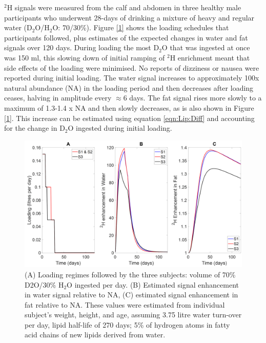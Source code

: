 \documentclass[class=article, crop=false]{standalone}
\begin{document}
$^2$H signals were measured from the calf and abdomen in three healthy male participants who underwent 28-days of drinking a mixture of heavy and regular water (D$_2$O/H$_2$O: 70/30\%). Figure \ref{1} shows the loading schedules that participants followed, plus estimates of the expected changes in water and fat signals over 120 days. During loading the most D$_2$O that was ingested at once was 150 ml, this slowing down of initial ramping of $^2$H enrichment meant that side effects of the loading were minimised. No reports of dizziness or nausea were reported during initial loading. The water signal increases to approximately 100x natural abundance (NA) in the loading period and then decreases after loading ceases, halving in amplitude every $\approx$6 days. The fat signal rises more slowly to a maximum of 1.3-1.4 x NA and then slowly decreases, as is also shown in Figure \ref{1}. This increase can be estimated using equation \ref{eqn:Lip:Diff} and accounting for the change in D$_2$O ingested during initial loading.  

\begin{figure}
    \centering
    \includegraphics[width=1\textwidth]{Figures/Lipid/Loading_Routine.png}
    \caption{(A) Loading regimes followed by the three subjects: volume of 70\% D2O/30\% H$_2$O ingested per day. (B) Estimated signal enhancement in water signal relative to NA, (C) estimated signal enhancement in fat relative to NA. These values were estimated from individual subject’s weight, height, and age, assuming 3.75 litre water turn-over per day, lipid half-life of 270 days\cite{Carnethon2002Serum19871998}; 5\% of hydrogen atoms in fatty acid chains of new lipids derived from water\cite{Turner2003MeasurementMIDA}.}
    \label{fig:Lip:Load}
\end{figure}
\end{document}
